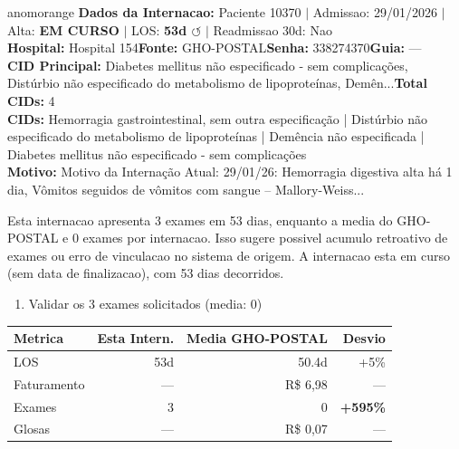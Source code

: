 \documentclass[a4paper,10pt]{article}
\begin{document}
\begin{anomalycard}[Internacao 9674 | GHO-POSTAL | ALTO (z=3.63)]{anomorange}
\textbf{Dados da Internacao:} Paciente 10370 $\mid$ Admissao: 29/01/2026 $\mid$ Alta: \textcolor{anomorange}{\textbf{EM CURSO}} $\mid$ LOS: \textbf{53d \textcolor{anomorange}{$\circlearrowleft$}} $\mid$ Readmissao 30d: Nao\\
\textbf{Hospital:} Hospital 154\quad\textbf{Fonte:} GHO-POSTAL\quad\textbf{Senha:} 338274370\quad\textbf{Guia:} ---\\
\textbf{CID Principal:} {\small Diabetes mellitus não especificado - sem complicações, Distúrbio não especificado do metabolismo de lipoproteínas, Demên...}\quad\textbf{Total CIDs:} 4\\

\textbf{CIDs:} {\scriptsize Hemorragia gastrointestinal, sem outra especificação | Distúrbio não especificado do metabolismo de lipoproteínas | Demência não especificada | Diabetes mellitus não especificado - sem complicações}\\

\textbf{Motivo:} {\scriptsize Motivo da Internação Atual:  29/01/26: Hemorragia digestiva alta há 1 dia, Vômitos seguidos de vômitos com sangue -- Mallory-Weiss...}\\

\vspace{2pt}\begin{tcolorbox}[colback=severityred!20,colframe=anomorange,title={\textbf{Interpretacao de Negocio}},fonttitle=\bfseries\small,left=4pt,right=4pt,top=3pt,bottom=3pt]
{\small Esta internacao apresenta 3 exames em 53 dias, enquanto a media do GHO-POSTAL e 0 exames por internacao. Isso sugere possivel acumulo retroativo de exames ou erro de vinculacao no sistema de origem. A internacao esta em curso (sem data de finalizacao), com 53 dias decorridos.}
\end{tcolorbox}
\begin{tcolorbox}[colback=severityyellow!30,colframe=anomorange,title={\textbf{Recomendacoes Especificas}},fonttitle=\bfseries\small,left=4pt,right=4pt,top=3pt,bottom=3pt]
\begin{enumerate}[nosep,leftmargin=16pt]
\item {\small Validar os 3 exames solicitados (media: 0)}
\end{enumerate}
\end{tcolorbox}
\begin{center}\begin{tabular}{l r r r}\toprule\textbf{Metrica} & \textbf{Esta Intern.} & \textbf{Media GHO-POSTAL} & \textbf{Desvio} \\\midrule
LOS & 53d & 50.4d & +5\% \\
Faturamento & --- & R\$ 6,98 & --- \\
Exames & 3 & 0 & \textcolor{anomred}{\textbf{+595\%}} \\
Glosas & --- & R\$ 0,07 & --- \\
\bottomrule\end{tabular}\end{center}


\end{anomalycard}
\end{document}
